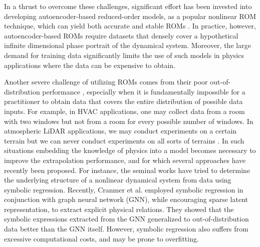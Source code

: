         
        In a thrust to overcome these challenges, significant effort has been invested into developing autoencoder-based reduced-order models, as a popular nonlinear ROM technique, which can yield both accurate and stable ROMs \cite{lee2020model,gin2021deep,champion2019data,kim2019deep}. In practice, however, autoencoder-based ROMs require datasets that densely cover a hypothetical infinite dimensional phase portrait of the dynamical system. Moreover, the large demand for training data significantly limits the use of such models in physics applications where the data can be expensive to obtain.
    

        Another severe challenge of utilizing ROMs comes from their poor out-of-distribution performance \cite{fries2022lasdi,cranmer2020discovering,gin2021deep}, especially when it is fundamentally impossible for a practitioner to obtain data that covers the entire distribution of possible data inputs. For example, in HVAC applications, one may collect data from a room with two windows but not from a room for every possible number of windows. In atmospheric LiDAR applications, we may conduct experiments on a certain terrain but we can never conduct experiments on all sorts of terrains \cite{nabi2020improving}. In such situations embedding the knowledge of physics into a model becomes necessary to improve the extrapolation performance, and for which several approaches have recently been proposed.
        For instance, the seminal works \cite{bongard2007automated,schmidt2009distilling} have tried to determine the underlying structure of a nonlinear dynamical system from data using symbolic regression. Recently, Cranmer et al. \cite{cranmer2020discovering} employed symbolic regression in conjunction with graph neural network (GNN), while encouraging sparse latent representation, to extract explicit physical relations. They showed that the symbolic expressions extracted from the GNN generalized to out-of-distribution data better than the GNN itself. However, symbolic regression also suffers from excessive computational costs,  and may be prone to overfitting.

      

